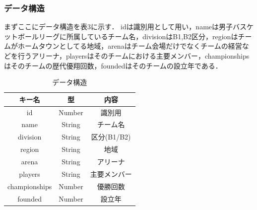 \documentclass[uplatex,dvipdfmx]{jsarticle}
\begin{document}
\subsubsection{データ構造}
まずここにデータ構造を表3に示す．
idは識別用として用い，nameは男子バスケットボールリーグに所属しているチーム名，divisionはB1,B2区分，regionはチームがホームタウンとしてる地域，arenaはチーム会場だけでなくチームの経営などを行うアリーナ，playersはそのチームにおける主要メンバー，championshipsはそのチームの歴代優翔回数，foundedはそのチームの設立年である．

\begin{table}[H]
    \centering
    \caption{データ構造}
    \label{tab:pulse_comparison}
    \setlength{\extrarowheight}{3pt} 
    \begin{tabular}{|c|c|c|}
        \hline
        キー名 & 型 & 内容 \\
        \hline
        id & Number & 識別用 \\
        \hline
        name & String & チーム名 \\
        \hline
        division & String & 区分(B1/B2) \\
        \hline
        region & String & 地域 \\
        \hline
        arena & String & アリーナ \\
        \hline
        players & String & 主要メンバー \\
        \hline
        championships & Number & 優勝回数 \\
 	\hline
        founded & Number & 設立年 \\
        \hline
     \end{tabular}
\end{table}
\end{document}
